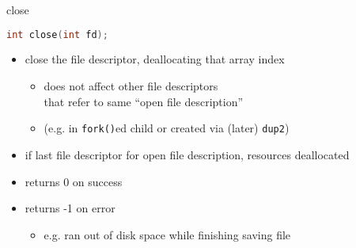 \begin{frame}[fragile,label=close]{close}
\begin{lstlisting}[language=C++]
int close(int fd);
\end{lstlisting}
\begin{itemize}
\item close the file descriptor, deallocating that array index
    \begin{itemize}
    \item does not affect other file descriptors \\ that refer to same ``open file description''
    \item (e.g. in \texttt{fork()}ed child or created via (later) \texttt{dup2})
    \end{itemize}
\item if last file descriptor for open file description, resources deallocated
\vspace{.5cm}
\item returns 0 on success
\item returns -1 on error
    \begin{itemize}
    \item e.g. ran out of disk space while finishing saving file
    \end{itemize}
\end{itemize}
\end{frame}
